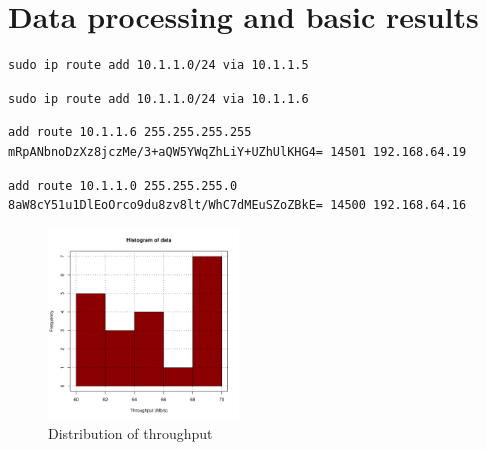 \section{Data processing and basic results}
\label{section:results}

\begin{verbatim}
sudo ip route add 10.1.1.0/24 via 10.1.1.5
\end{verbatim}

\begin{verbatim}
sudo ip route add 10.1.1.0/24 via 10.1.1.6
\end{verbatim}

\begin{small}
\begin{verbatim}
add route 10.1.1.6 255.255.255.255 mRpANbnoDzXz8jczMe/3+aQW5YWqZhLiY+UZhUlKHG4= 14501 192.168.64.19
\end{verbatim}
\end{small}

\begin{small}
\begin{verbatim}
add route 10.1.1.0 255.255.255.0 8aW8cY51u1DlEoOrco9du8zv8lt/WhC7dMEuSZoZBkE= 14500 192.168.64.16
\end{verbatim}
\end{small}

\begin{figure}[!hbt]\centering
  \includegraphics[width=0.45\textwidth]{graphics/throughput.pdf}
  \caption{Distribution of throughput}
  \label{fig:frame_sizes}
\end{figure}
